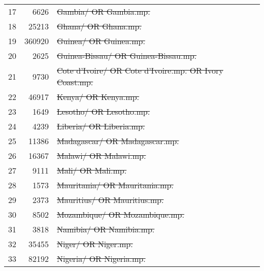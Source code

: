 \begin{tabular}{rrl}
	17 &   \num{6626} & \st{Gambia/ OR Gambia.mp.}                                                                \\
	18 &  \num{25213} & \st{Ghana/ OR Ghana.mp.}                                                                  \\
	19 & \num{360920} & \st{Guinea/ OR Guinea.mp.}                                                                \\
	20 &   \num{2625} & \st{Guinea-Bissau/ OR Guinea-Bissau.mp.}                                                  \\
	21 &   \num{9730} & \st{Cote d'Ivoire/ OR Cote d'Ivoire.mp. OR Ivory Coast.mp.}                               \\
	22 &  \num{46917} & \st{Kenya/ OR Kenya.mp.}                                                                  \\
	23 &   \num{1649} & \st{Lesotho/ OR Lesotho.mp.}                                                              \\
	24 &   \num{4239} & \st{Liberia/ OR Liberia.mp.}                                                              \\
	25 &  \num{11386} & \st{Madagascar/ OR Madagascar.mp.}                                                        \\
	26 &  \num{16367} & \st{Malawi/ OR Malawi.mp.}                                                                \\
	27 &   \num{9111} & \st{Mali/ OR Mali.mp.}                                                                    \\
	28 &   \num{1573} & \st{Mauritania/ OR Mauritania.mp.}                                                        \\
	29 &   \num{2373} & \st{Mauritius/ OR Mauritius.mp.}                                                          \\
	30 &   \num{8502} & \st{Mozambique/ OR Mozambique.mp.}                                                        \\
	31 &   \num{3818} & \st{Namibia/ OR Namibia.mp.}                                                              \\
	32 &  \num{35455} & \st{Niger/ OR Niger.mp.}                                                                  \\
	33 &  \num{82192} & \st{Nigeria/ OR Nigeria.mp.}                                                              \\

\end{tabular}
